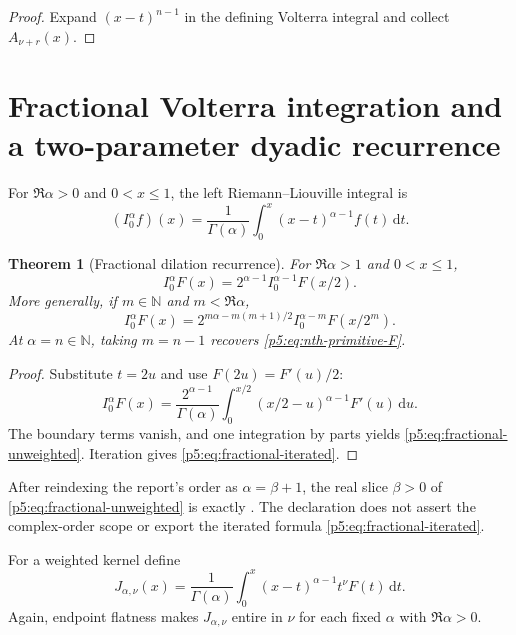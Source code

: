 \documentclass[11pt,oneside]{article}
\newtheorem{theorem}{Theorem}[section]
\theoremstyle{definition}
\theoremstyle{remark}
\newcommand{\N}{\mathbb N}
\newcommand{\dd}{\,\mathrm d}
\newcommand{\1}{\mathbf 1}
\begin{document}
\begin{proof}
Expand $(x-t)^{n-1}$ in the defining Volterra integral and collect $A_{\nu+r}(x)$.
\end{proof}

\section{Fractional Volterra integration and a two-parameter dyadic recurrence}

\begin{definition}
For $\Re\alpha>0$ and $0<x\le1$, the left Riemann--Liouville integral is
\begin{equation}
 (I_0^\alpha f)(x)=\frac1{\Gamma(\alpha)}
 \int_0^x(x-t)^{\alpha-1}f(t)\dd t.
\end{equation}
\end{definition}

\begin{theorem}[Fractional dilation recurrence]\label{p5:thm:fractional-unweighted}
For $\Re\alpha>1$ and $0<x\le1$,
\begin{equation}\label{p5:eq:fractional-unweighted}
 I_0^\alpha F(x)=2^{\alpha-1}I_0^{\alpha-1}F(x/2).
\end{equation}
More generally, if $m\in\N$ and $m<\Re\alpha$,
\begin{equation}\label{p5:eq:fractional-iterated}
 I_0^\alpha F(x)=
 2^{m\alpha-m(m+1)/2}I_0^{\alpha-m}F(x/2^m).
\end{equation}
At $\alpha=n\in\N$, taking $m=n-1$ recovers \eqref{p5:eq:nth-primitive-F}.
\end{theorem}

\begin{proof}
Substitute $t=2u$ and use $F(2u)=F'(u)/2$:
\[
 I_0^\alpha F(x)=\frac{2^{\alpha-1}}{\Gamma(\alpha)}
 \int_0^{x/2}(x/2-u)^{\alpha-1}F'(u)\dd u.
\]
The boundary terms vanish, and one integration by parts yields \eqref{p5:eq:fractional-unweighted}.  Iteration gives \eqref{p5:eq:fractional-iterated}.
\end{proof}

After reindexing the report's order as \(\alpha=\beta+1\), the real slice
\(\beta>0\) of \eqref{p5:eq:fractional-unweighted} is exactly
.  The declaration does not assert the
complex-order scope or export the iterated formula \eqref{p5:eq:fractional-iterated}.

For a weighted kernel define
\begin{equation}\label{p5:eq:J-alpha-nu}
 J_{\alpha,\nu}(x)=
 \frac1{\Gamma(\alpha)}\int_0^x
 (x-t)^{\alpha-1}t^\nu F(t)\dd t.
\end{equation}
Again, endpoint flatness makes $J_{\alpha,\nu}$ entire in $\nu$ for each fixed $\alpha$ with $\Re\alpha>0$.
\end{document}
